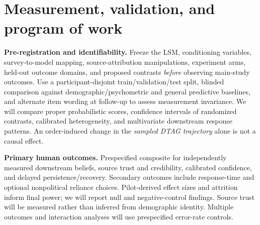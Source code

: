 \documentclass[10pt,letterpaper]{article}
\newcommand{\kv}[1]{\textbf{\color{ink}#1}}
\begin{document}
\newpage
\section*{Measurement, validation, and program of work}
\kv{Pre-registration and identifiability.} Freeze the LSM, conditioning variables, survey-to-model mapping, source-attribution manipulations, experiment arms, held-out outcome domains, and proposed contrasts \emph{before} observing main-study outcomes. Use a participant-disjoint train/validation/test split, blinded comparison against demographic/psychometric and general predictive baselines, and alternate item wording at follow-up to assess measurement invariance. We will compare proper probabilistic scores, confidence intervals of randomized contrasts, calibrated heterogeneity, and multivariate downstream response patterns. An order-induced change in the \emph{sampled DTAG trajectory} alone is not a causal effect.

\kv{Primary human outcomes.} Prespecified composite for independently measured downstream beliefs, source trust and credibility, calibrated confidence, and delayed persistence/recovery. Secondary outcomes include response-time and optional nonpolitical reliance choices. Pilot-derived effect sizes and attrition inform final power; we will report null and negative-control findings. Source trust will be measured rather than inferred from demographic identity. Multiple outcomes and interaction analyses will use prespecified error-rate controls.
\end{document}
